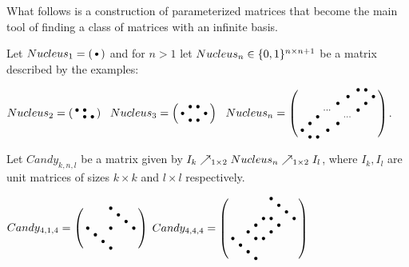 What follows is a construction of parameterized matrices that become the main tool of finding a class of matrices with an infinite basis.

\begin{defn}
Let $Nucleus_1=\left(\begin{smallmatrix}\bullet\end{smallmatrix}\right)$ and for $n>1$ let $Nucleus_n\in\{0,1\}^{n\times n+1}$ be a matrix described by the examples:
\begin{center}
$Nucleus_2=\smm{\bullet&\bullet& \\ &\bullet&\bullet}\ \ 
Nucleus_3=\smm{ &\bullet&\bullet& \\\bullet& & &\bullet\\ &\bullet&\bullet& }\ \ 
Nucleus_n=\smm{ & & & & & &\bullet&\bullet& \\ & & & & &\bullet& & &\bullet\\ & & & &\bullet& & &\bullet& \\ & & &\cdots& & &\bullet& & \\ & &\bullet& & &\cdots& & & \\ &\bullet& & &\bullet& & & & \\\bullet& & &\bullet& & & & & \\ &\bullet&\bullet& & & & & & \\}$.
\end{center}
\end{defn}

\begin{defn}
Let $Candy_{k,n,l}$ be a matrix given by $I_k\nearrow_{1\times2}Nucleus_n\nearrow_{1\times2}I_l$, where $I_k,I_l$ are unit matrices of sizes $k\times k$ and $l\times l$ respectively.
\end{defn}
$Candy_{4,1,4}=\left(\begin{smallmatrix}
 & & &\bullet& & & \\
 & & & &\bullet& & \\
 & & & & &\bullet& \\
\bullet& & &\bullet& & &\bullet\\
 &\bullet& & & & & \\
 & &\bullet& & & & \\
 & & &\bullet& & & \end{smallmatrix}\right)$
$Candy_{4,4,4}=\left(\begin{smallmatrix}
 & & & & &\bullet& & & \\
 & & & & & &\bullet& & \\
 & & & & & & &\bullet& \\
 & & & & \bullet&\bullet& & &\bullet\\
 & & &\bullet& & &\bullet& & \\
 & & \bullet& & &\bullet& & & \\
\bullet& & &\bullet&\bullet& & & & \\
 &\bullet& & & & & & & \\
 & &\bullet& & & & & & \\
 & & &\bullet& & & & & \end{smallmatrix}\right)$

